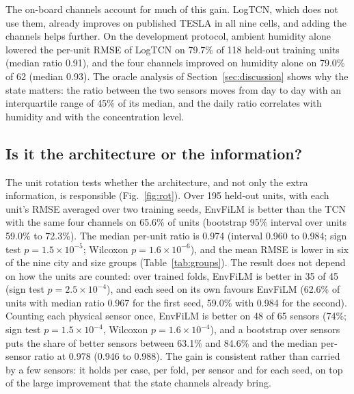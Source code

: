 \documentclass[journal]{IEEEtran}
\begin{document}
The on-board channels account for much of this gain. LogTCN, which does not use them, already improves on published
TESLA in all nine cells, and adding the channels helps further. On the development protocol, ambient humidity alone
lowered the per-unit RMSE of LogTCN on 79.7\% of 118 held-out training units (median ratio 0.91), and the four channels
improved on humidity alone on 79.0\% of 62 (median 0.93). The oracle analysis of Section~\ref{sec:discussion} shows why the
state matters: the ratio between the two sensors moves from day to day with an interquartile range of 45\% of its
median, and the daily ratio correlates with humidity and with the concentration level.

\subsection{Is it the architecture or the information?}
\label{sec:ablation}

The unit rotation tests whether the architecture, and not only the extra information, is responsible
(Fig.~\ref{fig:rot}). Over 195 held-out units, with each unit's RMSE averaged over two training seeds, EnvFiLM is better
than the TCN with the same four channels on 65.6\% of units (bootstrap 95\% interval over units 59.0\% to 72.3\%). The
median per-unit ratio is 0.974 (interval 0.960 to 0.984; sign test $p = 1.5\times10^{-5}$; Wilcoxon
$p = 1.6\times10^{-6}$), and the mean RMSE is lower in six of the nine city and size groups (Table~\ref{tab:groups}).
The result does not depend on how the units are counted: over trained folds, EnvFiLM is better in 35 of 45 (sign test
$p = 2.5\times10^{-4}$), and each seed on its own favours EnvFiLM (62.6\% of units with median ratio 0.967 for the
first seed, 59.0\% with 0.984 for the second). Counting each physical sensor once, EnvFiLM is better on 48 of 65
sensors (74\%; sign test $p = 1.5\times10^{-4}$, Wilcoxon $p = 1.6\times10^{-4}$), and a bootstrap over
sensors puts the share of better sensors between 63.1\% and 84.6\% and the median per-sensor ratio at 0.978 (0.946
to 0.988). The gain is consistent rather than carried by a few sensors: it holds per case, per fold, per
sensor and for each seed, on top of the large improvement that the state channels already bring.
\end{document}
